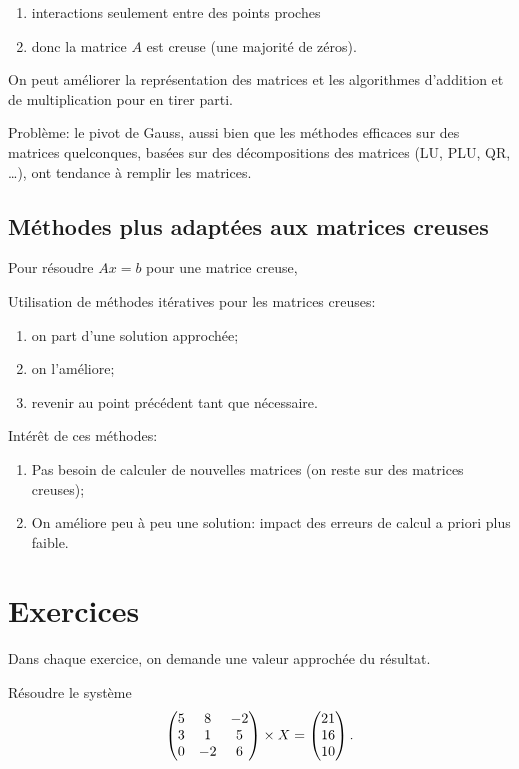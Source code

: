 \begin{enumerate}
\item interactions seulement entre des points proches
\item donc la matrice $A$ est creuse (une majorité de zéros).
\end{enumerate}

On peut améliorer la représentation des matrices et les algorithmes
d'addition et de multiplication pour en tirer parti.

Problème: le pivot de Gauss, aussi bien que les méthodes
\og{}efficaces\fg{} sur des matrices quelconques, basées sur des
décompositions des matrices  (LU, PLU, QR, \ldots{}), ont tendance à
remplir les matrices.

\subsection{Méthodes plus adaptées aux matrices creuses}

Pour résoudre $Ax=b$ pour une matrice creuse,

Utilisation de méthodes itératives pour les matrices creuses:
\begin{enumerate}
\item on part d'une solution approchée;
\item on l'améliore;
\item revenir au point précédent tant que nécessaire.
\end{enumerate}
 
Intérêt de ces méthodes:
\begin{enumerate}
\item Pas besoin de calculer de nouvelles matrices (on reste sur des
  matrices creuses);
\item On améliore peu à peu une solution: impact des erreurs de calcul
  a priori plus faible.
\end{enumerate}

\section{Exercices}

Dans chaque exercice, on demande une valeur approchée du résultat. 

  Résoudre le système 
  \begin{equation*}
    \begin{pmatrix} 5 & 8 & -2 \\ 3 & 1 & 5 \\ 0 & -2 & 6 \end{pmatrix} \times X = \begin{pmatrix} 21 \\ 16 \\ 10 \end{pmatrix}.
  \end{equation*}


